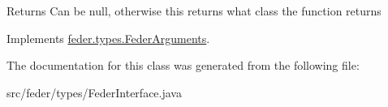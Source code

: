 \begin{DoxyReturn}{Returns}
Can be null, otherwise this returns what class the function returns 
\end{DoxyReturn}


Implements \hyperlink{interfacefeder_1_1types_1_1FederArguments}{feder.\+types.\+Feder\+Arguments}.



The documentation for this class was generated from the following file\+:\begin{DoxyCompactItemize}
\item 
src/feder/types/Feder\+Interface.\+java\end{DoxyCompactItemize}
